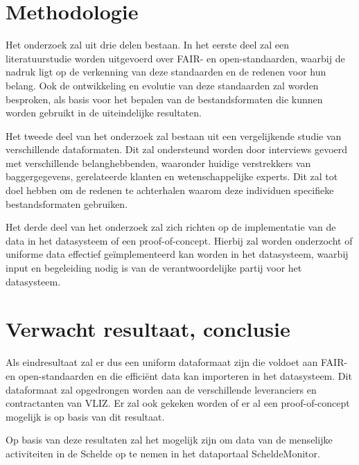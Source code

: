 
\section{Methodologie}%
\label{sec:methodologie}

Het onderzoek zal uit drie delen bestaan. In het eerste deel zal een literatuurstudie worden uitgevoerd over FAIR- en open-standaarden, waarbij de nadruk ligt op de verkenning van deze standaarden en de redenen voor hun belang. Ook de ontwikkeling en evolutie van deze standaarden zal worden besproken, als basis voor het bepalen van de bestandsformaten die kunnen worden gebruikt in de uiteindelijke resultaten.

Het tweede deel van het onderzoek zal bestaan uit een vergelijkende studie van verschillende dataformaten. Dit zal ondersteund worden door interviews gevoerd met verschillende belanghebbenden, waaronder huidige verstrekkers van baggergegevens, gerelateerde klanten en wetenschappelijke experts. Dit zal tot doel hebben om de redenen te achterhalen waarom deze individuen specifieke bestandsformaten gebruiken.

Het derde deel van het onderzoek zal zich richten op de implementatie van de data in het datasysteem of een proof-of-concept. Hierbij zal worden onderzocht of uniforme data effectief geïmplementeerd kan worden in het datasysteem, waarbij input en begeleiding nodig is van de verantwoordelijke partij voor het datasysteem.

\section{Verwacht resultaat, conclusie}%
\label{sec:verwachte_resultaten}

Als eindresultaat zal er dus een uniform dataformaat zijn die voldoet aan FAIR- en open-standaarden en die efficiënt data kan importeren in het datasysteem. Dit dataformaat zal opgedrongen worden aan de verschillende leveranciers en contractanten van VLIZ. Er zal ook gekeken worden of er al een proof-of-concept mogelijk is op basis van dit resultaat.

Op basis van deze resultaten zal het mogelijk zijn om data van de menselijke activiteiten in de Schelde op te nemen in het dataportaal ScheldeMonitor.

